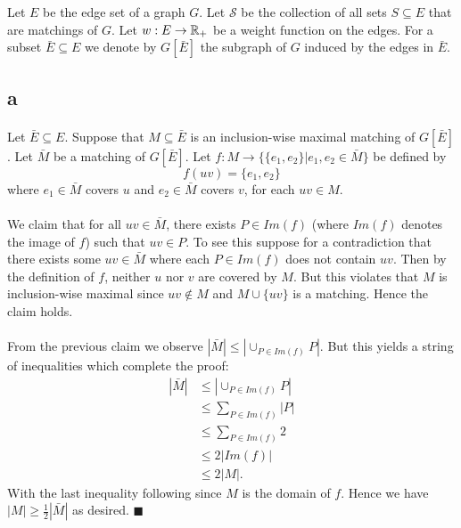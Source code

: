 \documentclass[letterpaper,12pt,oneside,onecolumn]{article}
\newcommand{\cS}{\mathcal{S}} \newcommand{\cT}{\mathcal{T}}
\begin{document}
\section{}
\paragraph{}
Let $E$ be the edge set of a graph $G$. Let $\cS$ be the collection of all sets $S \subseteq E$ that are matchings of $G$. Let $w: E \rightarrow \mathbb{R}_+$ be a weight function on the edges. For a subset $\bar{E} \subseteq E$ we denote by $G[\bar{E}]$ the subgraph of $G$ induced by the edges in $\bar{E}$.
\subsection{a}
\paragraph{}
Let $\bar{E} \subseteq E$. Suppose that $M \subseteq \bar{E}$ is an inclusion-wise maximal matching of $G[\bar{E}]$. Let $\bar{M}$ be a matching of $G[\bar{E}]$. Let $f : M \rightarrow \{ \{e_1,e_2\} | e_1, e_2 \in \bar{M}\}$ be defined by
$$ f(uv) = \{e_1, e_2\}$$
where $e_1 \in \bar{M}$ covers $u$ and $e_2 \in \bar{M}$ covers $v$, for each $uv \in M$.
\paragraph{}
We claim that for all $uv \in \bar{M}$, there exists $P \in Im(f)$ (where $Im(f)$ denotes the image of $f$) such that $uv \in P$. To see this suppose for a contradiction that there exists some $uv \in \bar{M}$ where each $P \in Im(f)$ does not contain $uv$. Then by the definition of $f$, neither $u$ nor $v$ are covered by $M$. But this violates that $M$ is inclusion-wise maximal since $uv \not\in M$ and $M \cup \{uv\}$ is a matching. Hence the claim holds.
\paragraph{}
From the previous claim we observe $|\bar{M}| \leq | \cup_{P \in Im(f)} P|$. But this yields a string of inequalities which complete the proof:
\begin{align*}
|\bar{M}| &\leq |\cup_{P \in Im(f)} P| \\
&\leq \sum_{P \in Im(f)} |P| \\
&\leq \sum_{P \in Im(f)} 2 \\
&\leq 2|Im(f)| \\
&\leq 2|M|. 
\end{align*}
With the last inequality following since $M$ is the domain of $f$. Hence we have $|M| \geq \frac{1}{2}|\bar{M}|$ as desired. $\blacksquare$
\end{document}
